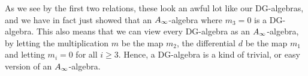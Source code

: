 As we see by the first two relations, these look an awful lot like our DG-algebras, and we have in fact just showed that an $A_{\infty}$-algebra where $m_3 = 0$ is a DG-algebra. This also means that we can view every DG-algebra as an $A_{\infty}$-algebra, by letting the multiplication $m$ be the map $m_2$, the differential $d$ be the map $m_1$ and letting $m_i=0$ for all $i\geq 3$. Hence, a DG-algebra is a kind of trivial, or easy version of an $A_{\infty}$-algebra. 



